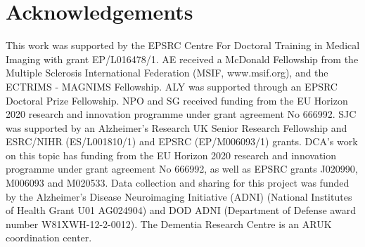 \documentclass{llncs}
\begin{document}
\section{Acknowledgements}

This work was supported by the EPSRC Centre For Doctoral Training in Medical Imaging with grant EP/L016478/1. AE received a McDonald Fellowship from the Multiple Sclerosis International Federation (MSIF, www.msif.org), and the ECTRIMS - MAGNIMS Fellowship. ALY was supported through an EPSRC Doctoral Prize Fellowship. NPO and SG received funding from the EU Horizon 2020 research and innovation programme under grant agreement No 666992. SJC was supported by an Alzheimer’s Research UK Senior Research Fellowship and ESRC/NIHR (ES/L001810/1) and EPSRC (EP/M006093/1) grants. DCA's work on this topic has funding from the EU Horizon 2020 research and innovation programme under grant agreement No 666992, as well as EPSRC grants J020990, M006093 and M020533. Data collection and sharing for this project was funded by the Alzheimer's Disease Neuroimaging Initiative (ADNI) (National Institutes of Health Grant U01 AG024904) and DOD ADNI (Department of Defense award number W81XWH-12-2-0012). The Dementia Research Centre is an ARUK coordination center.


%
\end{document}
